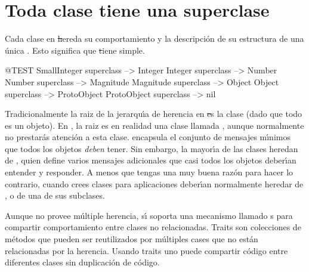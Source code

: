 \documentclass[a4paper,10pt,twoside]{book}
\begin{document}
\section{Toda clase tiene una superclase}


Cada clase en \st hereda su comportamiento y la descripci\'on de su estructura de una \'unica .
Esto significa que \st tiene  simple.

\begin{code}{@TEST}
SmallInteger superclass --> Integer
Integer superclass          --> Number
Number superclass        --> Magnitude
Magnitude superclass    --> Object
Object superclass           --> ProtoObject
ProtoObject superclass  --> nil
\end{code}


Tradicionalmente la raiz de la jerarqu\'\i{}a de herencia en \st es la clase  (dado que todo es un objeto).
En \pharo, la raiz es en realidad una clase llamada , aunque normalmente no prestar\'as atenci\'on a esta clase. 
 encapsula el conjunto de mensajes m\'\i{}nimos que todos los objetos \emph{deben} tener. Sin embargo, la mayor\'\i{}a de las clases heredan de , quien define varios mensajes adicionales que casi todos los objetos deber\'\i{}an entender y responder.
A menos que tengas una muy buena raz\'on para hacer lo contrario, cuando crees clases para aplicaciones deber\'\i{}an normalmente 
heredar de  , o de una de sus subclases.




Aunque \pharo no provee m\'ultiple herencia, s\'\i{} soporta una mecanismo llamado s para compartir comportamiento entre clases no relacionadas.
Traits son colecciones de m\'etodos que pueden ser reutilizados por m\'ultiples cases que no est\'an relacionadas por la herencia. Usando traits uno puede compartir c\'odigo entre diferentes clases sin duplicaci\'on de c\'odigo.
\end{document}
